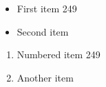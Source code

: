\documentclass{article}
\begin{document}
\begin{itemize}
\item First item 249
\item Second item
\end{itemize}
\begin{enumerate}
\item Numbered item 249
\item Another item
\end{enumerate}
\end{document}
